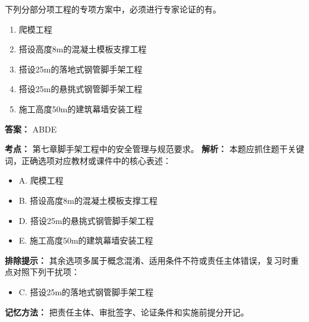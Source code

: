\documentclass[UTF8,fontset=fandol,11pt]{ctexart}
\begin{document}
\begin{quizbox}[title={第 8 题}]
下列分部分项工程的专项方案中，必须进行专家论证的有。\\
\begin{enumerate}[label=\Alph*.]
\item 爬模工程
\item 搭设高度8m的混凝土模板支撑工程
\item 搭设25m的落地式钢管脚手架工程
\item 搭设25m的悬挑式钢管脚手架工程
\item 施工高度50m的建筑幕墙安装工程
\end{enumerate}
\textbf{答案：} ABDE
\vspace{0.25em}
\begin{answerbox}[title={考点解析}]
\textbf{考点：} 第七章脚手架工程中的安全管理与规范要求。
\textbf{解析：} 本题应抓住题干关键词，正确选项对应教材或课件中的核心表述：
\begin{itemize}
\item A. 爬模工程
\item B. 搭设高度8m的混凝土模板支撑工程
\item D. 搭设25m的悬挑式钢管脚手架工程
\item E. 施工高度50m的建筑幕墙安装工程
\end{itemize}
\textbf{排除提示：} 其余选项多属于概念混淆、适用条件不符或责任主体错误，复习时重点对照下列干扰项：
\begin{itemize}
\item C. 搭设25m的落地式钢管脚手架工程
\end{itemize}
\textbf{记忆方法：} 把责任主体、审批签字、论证条件和实施前提分开记。
\end{answerbox}
\end{quizbox}

\vspace{0.2em}
\end{document}
